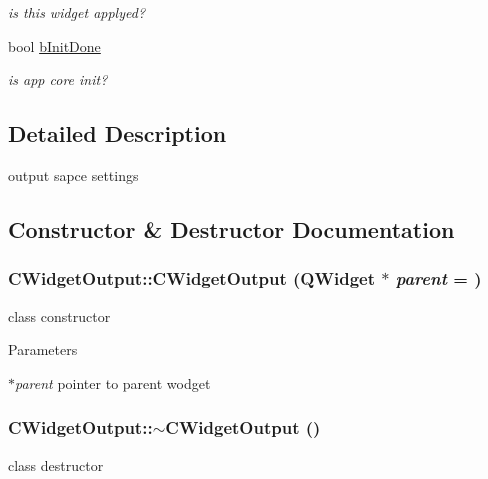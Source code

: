 \begin{DoxyCompactItemize}
\begin{DoxyCompactList}\small\item\em is this widget applyed? \item\end{DoxyCompactList}\item 
\hypertarget{classCWidgetOutput_a19c61753da4854845cfa0c1a1fc63a82}{
bool \hyperlink{classCWidgetOutput_a19c61753da4854845cfa0c1a1fc63a82}{bInitDone}}
\label{classCWidgetOutput_a19c61753da4854845cfa0c1a1fc63a82}

\begin{DoxyCompactList}\small\item\em is app core init? \item\end{DoxyCompactList}\end{DoxyCompactItemize}


\subsection{Detailed Description}
output sapce settings 

\subsection{Constructor \& Destructor Documentation}
\hypertarget{classCWidgetOutput_aa50b2f8c1d87552f95a98b89cdceb2e7}{
\subsubsection[{CWidgetOutput}]{\setlength{\rightskip}{0pt plus 5cm}CWidgetOutput::CWidgetOutput (QWidget $\ast$ {\em parent} = {})}}
\label{classCWidgetOutput_aa50b2f8c1d87552f95a98b89cdceb2e7}
class constructor


\begin{DoxyParams}{Parameters}
\item[{\em $\ast$parent}]pointer to parent wodget \end{DoxyParams}
\hypertarget{classCWidgetOutput_ae061db04883a78a2cd0f5bc01e37ec6d}{
\subsubsection[{$\sim$CWidgetOutput}]{\setlength{\rightskip}{0pt plus 5cm}CWidgetOutput::$\sim$CWidgetOutput ()}}
\label{classCWidgetOutput_ae061db04883a78a2cd0f5bc01e37ec6d}
class destructor 

